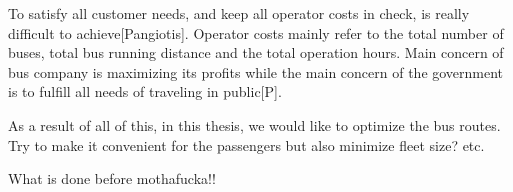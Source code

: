 To satisfy all customer needs, and keep all operator costs in check, is really difficult to achieve[Pangiotis]. Operator costs mainly refer to the total number of buses, total bus running distance and the total operation hours. Main concern of bus company is maximizing its profits while the main concern of the government is to fulfill all needs of traveling in public[P]. 

As a result of all of this, in this thesis, we would like to optimize the bus routes. Try to make it convenient for the passengers but also minimize fleet size? etc.

What is done before mothafucka!!















